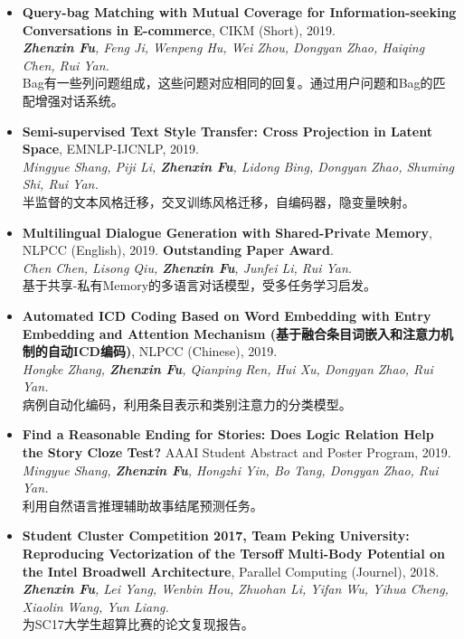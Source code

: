 \documentclass[letterpaper]{article}
\begin{document}
\begin{itemize}

\item \textbf{Query-bag Matching with Mutual Coverage for Information-seeking Conversations in E-commerce}, CIKM (Short), 2019. \\
{\it \textbf{Zhenxin Fu}, Feng Ji, Wenpeng Hu, Wei Zhou, Dongyan Zhao, Haiqing Chen, Rui Yan. } \\
Bag有一些列问题组成，这些问题对应相同的回复。通过用户问题和Bag的匹配增强对话系统。

\item \textbf{Semi-supervised Text Style Transfer: Cross Projection in Latent Space}, EMNLP-IJCNLP, 2019. \\
{\it Mingyue Shang, Piji Li, \textbf{Zhenxin Fu}, Lidong Bing, Dongyan Zhao, Shuming Shi, Rui Yan.} \\
半监督的文本风格迁移，交叉训练风格迁移，自编码器，隐变量映射。

\item \textbf{Multilingual Dialogue Generation with Shared-Private Memory}, NLPCC (English), 2019. \textbf{Outstanding Paper Award}. \\
{\it Chen Chen, Lisong Qiu, \textbf{Zhenxin Fu}, Junfei Li, Rui Yan. } \\
基于共享-私有Memory的多语言对话模型，受多任务学习启发。

\item \textbf{Automated ICD Coding Based on Word Embedding with Entry Embedding and Attention Mechanism (基于融合条目词嵌入和注意力机制的自动ICD编码)}, NLPCC (Chinese), 2019. \\
{\it Hongke Zhang, \textbf{Zhenxin Fu}, Qianping Ren, Hui Xu, Dongyan Zhao, Rui Yan.} \\
病例自动化编码，利用条目表示和类别注意力的分类模型。

\item \textbf{Find a Reasonable Ending for Stories: Does Logic Relation Help the Story Cloze Test?} AAAI Student Abstract and Poster Program, 2019. \\
{\it Mingyue Shang, \textbf{Zhenxin Fu}, Hongzhi Yin, Bo Tang, Dongyan Zhao, Rui Yan.} \\
利用自然语言推理辅助故事结尾预测任务。

\item \textbf{Student Cluster Competition 2017, Team Peking University: Reproducing Vectorization of the Tersoff Multi-Body Potential on the Intel Broadwell Architecture}, Parallel Computing (Journel), 2018. \\
{\it \textbf{Zhenxin Fu}, Lei Yang, Wenbin Hou, Zhuohan Li, Yifan Wu, Yihua Cheng, Xiaolin Wang, Yun Liang.} \\
为SC17大学生超算比赛的论文复现报告。


\end{itemize}
\end{document}
